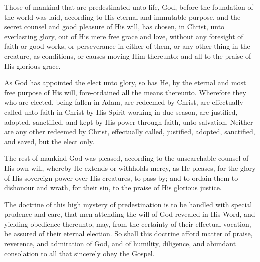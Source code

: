 \begin{outerlst}[left=0pt,labelsep=0pt]
\begin{innerlst}[resume*]
\item Those of mankind that are predestinated unto life, God, before the foundation of the world was laid, according to His eternal and immutable purpose, and the secret counsel and good pleasure of His will, has chosen, in Christ, unto everlasting glory, out of His mere free grace and love, without any foresight of faith or good works, or perseverance in either of them, or any other thing in the creature, as conditions, or causes moving Him thereunto: and all to the praise of His glorious grace.   

\item As God has appointed the elect unto glory, so has He, by the eternal and most free purpose of His will, fore-ordained all the means thereunto. Wherefore they who are elected, being fallen in Adam, are redeemed by Christ, are effectually called unto faith in Christ by His Spirit working in due season, are justified, adopted, sanctified, and kept by His power through faith, unto salvation. Neither are any other redeemed by Christ, effectually called, justified, adopted, sanctified, and saved, but the elect only.   

\item The rest of mankind God was pleased, according to the unsearchable counsel of His own will, whereby He extends or withholds mercy, as He pleases, for the glory of His sovereign power over His creatures, to pass by; and to ordain them to dishonour and wrath, for their sin, to the praise of His glorious justice.   

\item The doctrine of this high mystery of predestination is to be handled with special prudence and care, that men attending the will of God revealed in His Word, and yielding obedience thereunto, may, from the certainty of their effectual vocation, be assured of their eternal election. So shall this doctrine afford matter of praise, reverence, and admiration of God, and of humility, diligence, and abundant consolation to all that sincerely obey the Gospel.  
\end{innerlst}


\end{outerlst}
